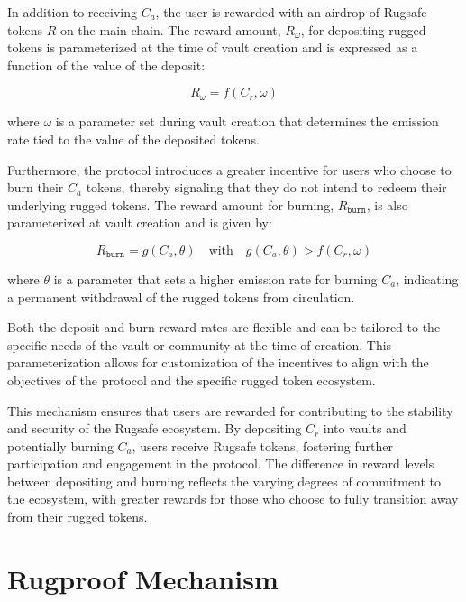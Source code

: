 \documentclass{article}
\begin{document}
In addition to receiving $C_a$, the user is rewarded with an airdrop of Rugsafe tokens $R$ on the main chain. The reward amount, $R_{\omega}$, for depositing rugged tokens is parameterized at the time of vault creation and is expressed as a function of the value of the deposit:

\[
R_{\omega} = f(C_r, \omega)
\]

where $\omega$ is a parameter set during vault creation that determines the emission rate tied to the value of the deposited tokens.

Furthermore, the protocol introduces a greater incentive for users who choose to burn their $C_a$ tokens, thereby signaling that they do not intend to redeem their underlying rugged tokens. The reward amount for burning, $R_{\texttt{burn}}$, is also parameterized at vault creation and is given by:

\[
R_{\texttt{burn}} = g(C_a, \theta) \quad \text{with} \quad g(C_a, \theta) > f(C_r, \omega)
\]

where $\theta$ is a parameter that sets a higher emission rate for burning $C_a$, indicating a permanent withdrawal of the rugged tokens from circulation.

Both the deposit and burn reward rates are flexible and can be tailored to the specific needs of the vault or community at the time of creation. This parameterization allows for customization of the incentives to align with the objectives of the protocol and the specific rugged token ecosystem.

This mechanism ensures that users are rewarded for contributing to the stability and security of the Rugsafe ecosystem. By depositing $C_r$ into vaults and potentially burning $C_a$, users receive Rugsafe tokens, fostering further participation and engagement in the protocol. The difference in reward levels between depositing and burning reflects the varying degrees of commitment to the ecosystem, with greater rewards for those who choose to fully transition away from their rugged tokens.













\section{Rugproof Mechanism}
\end{document}
